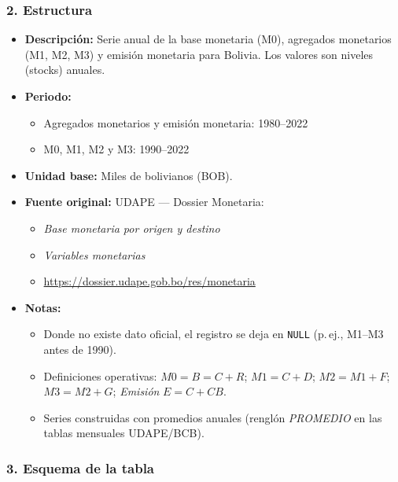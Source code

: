 \documentclass[12pt,a4paper]{article}
\begin{document}
\subsubsection*{2. Estructura}
\begin{itemize}
  \item \textbf{Descripción:} Serie anual de la base monetaria (M0), agregados monetarios (M1, M2, M3) y emisión monetaria para Bolivia. Los valores son niveles (stocks) anuales.
  \item \textbf{Periodo:} 
    \begin{itemize}
      \item Agregados monetarios y emisión monetaria: 1980--2022
      \item M0, M1, M2 y M3: 1990--2022
    \end{itemize}
  \item \textbf{Unidad base:} Miles de bolivianos (BOB).
  \item \textbf{Fuente original:} UDAPE — Dossier Monetaria:
    \begin{itemize}
      \item \emph{Base monetaria por origen y destino}
      \item \emph{Variables monetarias}
      \item \url{https://dossier.udape.gob.bo/res/monetaria}
    \end{itemize}
  \item \textbf{Notas:}
    \begin{itemize}
      \item Donde no existe dato oficial, el registro se deja en \texttt{NULL} (p.\,ej., M1--M3 antes de 1990).
      \item Definiciones operativas: $M0=B=C+R$; $M1=C+D$; $M2=M1+F$; $M3=M2+G$; \emph{Emisión} $E=C+CB$.
      \item Series construidas con promedios anuales (renglón \emph{PROMEDIO} en las tablas mensuales UDAPE/BCB).
    \end{itemize}
\end{itemize}

\subsubsection*{3. Esquema de la tabla}
\end{document}
